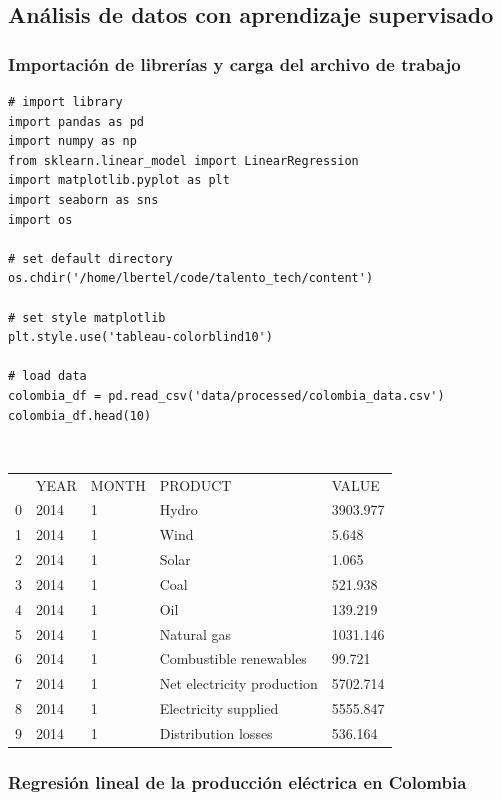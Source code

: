 \documentclass{article}
\begin{document}
\subsection{An\'alisis de datos con aprendizaje supervisado}

\subsubsection{Importaci\'on de librer\'ias y carga del archivo de trabajo}

\begin{verbatim}
# import library
import pandas as pd
import numpy as np
from sklearn.linear_model import LinearRegression
import matplotlib.pyplot as plt
import seaborn as sns
import os
	
# set default directory
os.chdir('/home/lbertel/code/talento_tech/content')

# set style matplotlib
plt.style.use('tableau-colorblind10')

# load data
colombia_df = pd.read_csv('data/processed/colombia_data.csv')
colombia_df.head(10)
\end{verbatim}

{\tt
	\begin{tabular}{lllll}
		& YEAR & MONTH & PRODUCT                    & VALUE    \\
		0   & 2014 & 1     & Hydro                      & 3903.977 \\
		1   & 2014 & 1     & Wind                       & 5.648    \\
		2   & 2014 & 1     & Solar                      & 1.065    \\
		3   & 2014 & 1     & Coal                       & 521.938  \\
		4   & 2014 & 1     & Oil                        & 139.219  \\
		5   & 2014 & 1     & Natural gas                & 1031.146 \\
		6   & 2014 & 1     & Combustible renewables     & 99.721   \\
		7   & 2014 & 1     & Net electricity production & 5702.714 \\
		8   & 2014 & 1     & Electricity supplied       & 5555.847 \\
		9   & 2014 & 1     & Distribution losses        & 536.164 
	\end{tabular}
}

\subsubsection{Regresión lineal de la producción eléctrica en Colombia}
\end{document}
